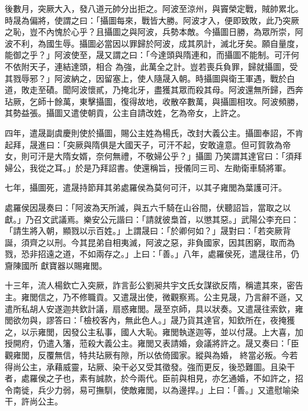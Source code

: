 \begin{pinyinscope}
 後數月，突厥大入，發八道元帥分出拒之。阿波至涼州，與竇榮定戰，賊帥累北。時晟為偏將，使謂之曰：「攝圖每來，戰皆大勝。阿波才入，便即致敗，此乃突厥之恥，豈不內愧於心乎？且攝圖之與阿波，兵勢本敵。今攝圖日勝，為眾所崇，阿波不利，為國生辱。攝圖必當因以罪歸於阿波，成其夙計，滅北牙矣。願自量度，能御之乎？」阿波使至，晟又謂之曰：「今達頭與隋連和，而攝圖不能制。可汗何不依附天子，連結達頭，相合
 為強，此萬全之計。豈若喪兵負罪，歸就攝圖，受其戮辱邪？」阿波納之，因留塞上，使人隨晟入朝。時攝圖與衛王軍遇，戰於白道，敗走至磧。聞阿波懷貳，乃掩北牙，盡獲其眾而殺其母。阿波還無所歸，西奔玷厥，乞師十餘萬，東擊攝圖，復得故地，收散卒數萬，與攝圖相攻。阿波頻勝，其勢益張。攝圖又遣使朝貢，公主自請改姓，乞為帝女，上許之。



 四年，遣晟副虞慶則使於攝圖，賜公主姓為楊氏，改封大義公主。攝圖奉詔，不肯起拜，晟進曰：「突厥與隋俱是大國天子，可汗不起，安敢違意。但可賀敦為帝女，則可汗是大隋女婿，奈何無禮，不敬婦公乎？」攝圖
 乃笑謂其達官曰：「須拜婦公，我從之耳。」於是乃拜詔書。使還稱旨，授儀同三司、左勛衛車騎將軍。



 七年，攝圖死，遣晟持節拜其弟處羅侯為莫何可汗，以其子雍閭為葉護可汗。



 處羅侯因晟奏曰：「阿波為天所滅，與五六千騎在山谷間，伏聽詔旨，當取之以獻。」乃召文武議焉。樂安公元諧曰：「請就彼梟首，以懲其惡。」武陽公李充曰：「請生將入朝，顯戮以示百姓。」上謂晟曰：「於卿何如？」晟對曰：「若突厥背誕，須齊之以刑。今其昆弟自相夷滅，阿波之惡，非負國家，因其困窮，取而為戮，恐非招遠之道，不如兩存之。」上曰：「善。」八年，處羅侯死，遣晟往吊，仍齎陳國所
 獻寶器以賜雍閭。



 十三年，流人楊欽亡入突厥，詐言彭公劉昶共宇文氏女謀欲反隋，稱遣其來，密告主。雍閭信之，乃不修職貢。又遣晟出使，微觀察焉。公主見晟，乃言辭不遜，又遣所私胡人安遂迦共欽計議，扇惑雍閭。晟至京師，具以狀奏。又遣晟往索欽，雍閭欲勿與，謬答曰：「檢校客內，無此色人。」晟乃貨其達官，知欽所在，夜掩獲之，以示雍閭，因發公主私事，國人大恥。雍閭執遂迦等，並以付晟。上大喜，加授開府，仍遣入籓，蒞殺大義公主。雍閭又表請婚，僉議將許之。晟又奏曰：「臣觀雍閭，反覆無信，特共玷厥有隙，所以依倚國家。縱與為婚，
 終當必叛。今若得尚公主，承藉威靈，玷厥、染干必又受其徵發。強而更反，後恐難圖。且染干者，處羅侯之子也，素有誠款，於今兩代。臣前與相見，亦乞通婚，不如許之，招令南徙，兵少力弱，易可撫馴，使敵雍閭，以為邊捍。」上曰：「善。」又遣慰喻染干，許尚公主。




\end{pinyinscope}
